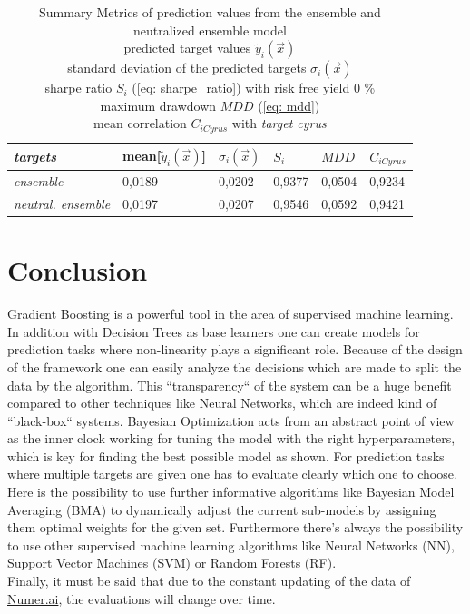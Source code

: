 \documentclass[12pt, a4paper]{article}
\begin{document}
\begin{table}[!htbp]
\centering
\caption{Summary Metrics of prediction values from the ensemble and neutralized ensemble model \\
predicted target values $\tilde{y}_i(\vec{x})$ \\
standard deviation of the predicted targets $\sigma_i(\vec{x})$ \\
sharpe ratio $S_i$ (\ref{eq: sharpe_ratio}) with risk free yield 0 \% \\
maximum drawdown $MDD$ (\ref{eq: mdd}) \\
mean correlation $C_{iCyrus}$ with \textit{target cyrus} \\}
\label{table: summary_metric_predictions_neutral_ensemble}
\begin{tabular}{|l|l|l|l|l|l|}
\hline
\textit{targets} & mean[$\tilde{y}_i(\vec{x})$] & $\sigma_i(\vec{x})$ & $S_i$ & $MDD$ & $C_{iCyrus}$ \\ \hline
\hline
\hline
\textit{ensemble} & 0,0189 & 0,0202 & 0,9377 & 0,0504 & 0,9234 \\ \hline
\hline
\textit{neutral. ensemble} & 0,0197 & 0,0207 & 0,9546 & 0,0592 & 0,9421 \\ \hline 
\end{tabular}
\end{table}

\newpage
\section{Conclusion}
Gradient Boosting is a powerful tool in the area of supervised machine learning. In addition with Decision Trees as base learners one can create models for prediction tasks where non-linearity plays a significant role. 
Because of the design of the framework one can easily analyze the decisions which are made to split the data by the algorithm. This ``transparency`` of the system can be a huge benefit compared to other techniques like Neural Networks, which are indeed kind of ``black-box`` systems. Bayesian Optimization acts from an abstract point of view as the inner clock working for tuning the model with the right hyperparameters, which is key for finding the best possible model as shown. For prediction tasks where multiple targets are given one has to evaluate clearly which one to choose. Here is the possibility to use further informative algorithms like Bayesian Model Averaging (BMA) to dynamically adjust the current sub-models by assigning them optimal weights for the given set. Furthermore there's always the possibility to use other supervised machine learning algorithms like Neural Networks (NN), Support Vector Machines (SVM) or Random Forests (RF). \\
Finally, it must be said that due to the constant updating of the data of \href{https://numer.ai}{Numer.ai}, the evaluations will change over time.
\end{document}
